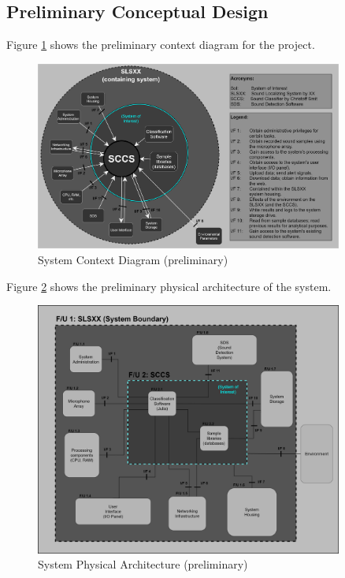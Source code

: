 \documentclass[a4paper,12pt]{article}
\numberwithin{equation}{section}
\numberwithin{figure}{section}
\numberwithin{table}{section}
\begin{document}
\subsection{Preliminary Conceptual Design}\label{section_prelimConceptDesign}

Figure \ref{prelim_scd} shows the preliminary context diagram for the project.

\begin{figure}[h!]
    \centering %
    \includegraphics[padding=1ex,width=0.9\textwidth,frame]{img/prelim_scd.png}
    \caption{System Context Diagram (preliminary)}
    \label{prelim_scd}
\end{figure}


Figure \ref{prelim_physArch} shows the preliminary physical architecture of the system.

\begin{figure}[h!]
    \centering %
    \includegraphics[padding=1ex,width=0.9\textwidth,frame]{img/prelim_physArch.png}
    \caption{System Physical Architecture (preliminary)}
    \label{prelim_physArch}
\end{figure}
\end{document}
